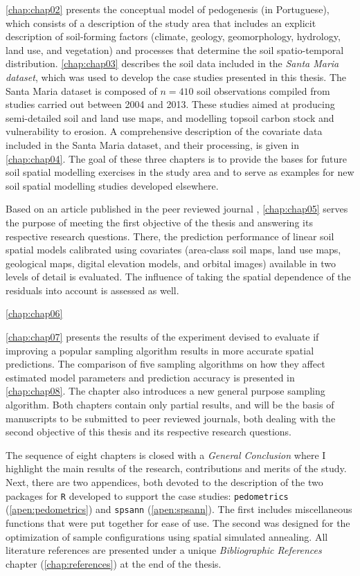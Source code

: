 \autoref{chap:chap02} presents the conceptual model of pedogenesis (in Portuguese), which consists of a 
description of the study area that includes an explicit description of soil-forming factors (climate, geology, 
geomorphology, hydrology, land use, and vegetation) and processes that determine the soil spatio-temporal 
distribution. \autoref{chap:chap03} describes the soil data included in the \emph{Santa Maria dataset}, which 
was used to develop the case studies presented in this thesis. The Santa Maria dataset is composed of 
$n = 410$ soil observations compiled from studies carried out between \num{2004} and \num{2013}. These studies 
aimed at producing semi-detailed soil and land use maps, and modelling topsoil carbon stock and vulnerability 
to erosion. A comprehensive description of the covariate data included in the Santa Maria dataset, and their 
processing, is given in \autoref{chap:chap04}. The goal of these three chapters is to provide the bases for 
future soil spatial modelling exercises in the study area and to serve as examples for new soil spatial 
modelling studies developed elsewhere.

Based on an article published in the peer reviewed journal \geoderma, \autoref{chap:chap05} serves the purpose 
of meeting the first objective of the thesis and answering its respective research questions. There, the 
prediction performance of linear soil spatial models calibrated using covariates (area-class soil maps, land 
use maps, geological maps, digital elevation models, and orbital images) available in two levels of detail is 
evaluated. The influence of taking the spatial dependence of the residuals into account is assessed as well. 

\autoref{chap:chap06}

\autoref{chap:chap07} presents the results of the experiment devised to evaluate if improving a popular 
sampling algorithm results in more accurate spatial predictions. The comparison of five sampling algorithms on 
how they affect estimated model parameters and prediction accuracy is presented in \autoref{chap:chap08}. The 
chapter also introduces a new general purpose sampling algorithm. Both chapters contain only partial results, 
and will be the basis of manuscripts to be submitted to peer reviewed journals, both dealing with the second 
objective of this thesis and its respective research questions.

The sequence of eight chapters is closed with a \emph{General Conclusion} where I highlight the main results 
of the research, contributions and merits of the study. Next, there are two appendices, both devoted to the 
description of the two packages for \texttt{R} developed to support the case studies: \texttt{pedometrics} 
(\autoref{apen:pedometrics}) and \texttt{spsann} (\autoref{apen:spsann}). The first includes miscellaneous 
functions that were put together for ease of use. The second was designed for the optimization of sample 
configurations using spatial simulated annealing. All literature references are presented under a unique 
\emph{Bibliographic References} chapter (\autoref{chap:references}) at the end of the thesis.

